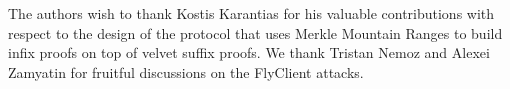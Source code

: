 
The authors wish to thank Kostis Karantias for his valuable contributions with respect to
the design of the protocol that uses Merkle Mountain Ranges to build infix proofs on top
of velvet suffix proofs. We thank Tristan Nemoz and Alexei Zamyatin for fruitful discussions
on the FlyClient attacks.
